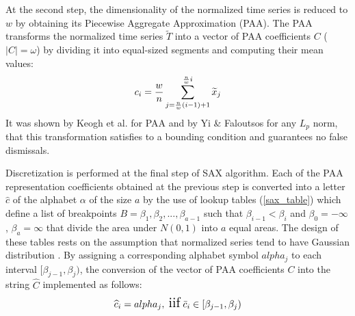 At the second step, the dimensionality of the normalized time series is reduced to $w$ by obtaining its 
Piecewise Aggregate Approximation (PAA). The PAA transforms the normalized time series $\widetilde{T}$ into a vector 
of PAA coefficients $C$ ($|C|=\omega$) by dividing it into equal-sized segments and computing their mean values:
\begin{equation}
\Large
c_{i} = \frac{w}{n} \sum_{j=\frac{n}{w}(i-1)+1}^{\frac{n}{w}i} \widetilde{x}_{j}
\label{eq:paa}
\end{equation}
It was shown by Keogh et al. \cite{citeulike:3000416} for PAA and by Yi \& Faloutsos \cite{citeulike:2946589} for any $L_{p}$ norm,
that this transformation satisfies to a bounding condition and guarantees no false dismissals.

Discretization is performed at the final step of SAX algorithm. Each of the PAA representation coefficients obtained at the previous step 
is converted into a letter $\widehat{c}$ of the alphabet $\alpha$ of the size $a$ by the use of lookup tables (\ref{sax_table}) which define a 
list of breakpoints $B=\beta_{1}, \beta_{2}, ... , \beta_{a-1}$ such that $\beta_{i-1} < \beta_{i}$ and $\beta_{0} = -\infty$, $\beta_{a} = \infty$ 
that divide the area under $N(0,1)$ into $a$ equal areas. The design of these tables rests on the assumption that normalized series tend to have 
Gaussian distribution \cite{citeulike:10141990}.
By assigning a corresponding alphabet symbol $alpha_{j}$ to each interval $[\beta_{j-1},\beta_{j})$, the conversion of the vector of PAA coefficients 
$C$ into the string $\widehat{C}$ implemented as follows: 
\begin{equation}
\Large
\widehat{c}_{i} = alpha_{j}, \; \text{iif} \; \bar{c}_{i} \in [\beta_{j-1},\beta_{j})
\label{eq:sax_alphabet}
\end{equation}

